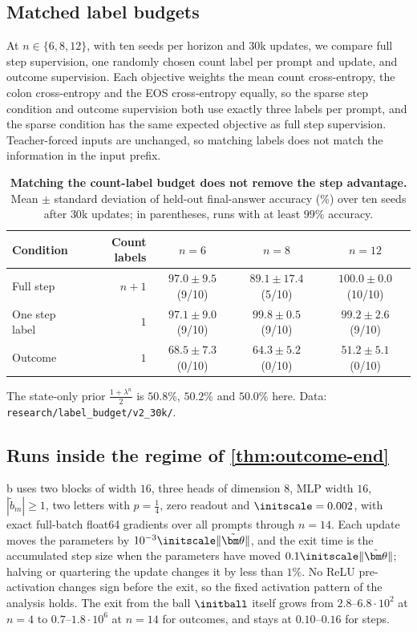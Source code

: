 \subsection{Matched label budgets}
\label{app:label-budget}
At $n\in\{6,8,12\}$, with ten seeds per horizon and $30$k updates, we compare full step supervision, one randomly chosen count label per
prompt and update, and outcome supervision. Each objective weights the mean count cross-entropy, the colon cross-entropy and the EOS
cross-entropy equally, so the sparse step condition and outcome supervision both use exactly three labels per prompt, and the sparse
condition has the same expected objective as full step supervision. Teacher-forced inputs are unchanged, so matching labels does not
match the information in the input prefix.

\begin{table}[H]
\centering\small
\begin{tabular}{@{}lrccc@{}}
\toprule
Condition & Count labels & $n=6$ & $n=8$ & $n=12$\\
\midrule
Full step & $n+1$ & $97.0\pm9.5$ (9/10) & $89.1\pm17.4$ (5/10) & $100.0\pm0.0$ (10/10)\\
One step label & $1$ & $97.1\pm9.0$ (9/10) & $99.8\pm0.5$ (9/10) & $99.2\pm2.6$ (9/10)\\
Outcome & $1$ & $68.5\pm7.3$ (0/10) & $64.3\pm5.2$ (0/10) & $51.2\pm5.1$ (0/10)\\
\bottomrule
\end{tabular}
\caption{\textbf{Matching the count-label budget does not remove the step advantage.} Mean $\pm$ standard deviation of
held-out final-answer accuracy (\%) over ten seeds after $30$k updates; in parentheses, runs with at least $99\%$ accuracy.}
\label{tab:label-budget}
\end{table}
The state-only prior $\frac{1+\lambda^n}2$ is $50.8\%$, $50.2\%$ and $50.0\%$ here. Data: \nolinkurl{research/label_budget/v2_30k/}.

\subsection{Runs inside the regime of \texorpdfstring{\cref{thm:outcome-end}}{Theorem 1(ii)}}
\label{app:exp-regime}
\label{app:regime}
b uses two blocks of width $16$, three heads of dimension $8$, MLP width $16$, $|\tilde b_m|\ge1$, two letters with
$p=\frac14$, zero readout and $\initscale=0.002$, with exact full-batch float64 gradients over all prompts through $n=14$. Each update moves the
parameters by $10^{-3}\initscale\|\tilde{\bm\theta}\|$, and the exit time is the accumulated step size when the parameters have moved
$0.1\initscale\|\tilde{\bm\theta}\|$; halving or quartering the update changes it by less than $1\%$. No ReLU pre-activation changes sign
before the exit, so the fixed activation pattern of the analysis holds. The exit from the ball $\initball$ itself grows from
$2.8$--$6.8\cdot10^2$ at $n=4$ to $0.7$--$1.8\cdot10^6$ at $n=14$ for outcomes, and stays at $0.10$--$0.16$ for steps.
\label{tab:exit-times}

